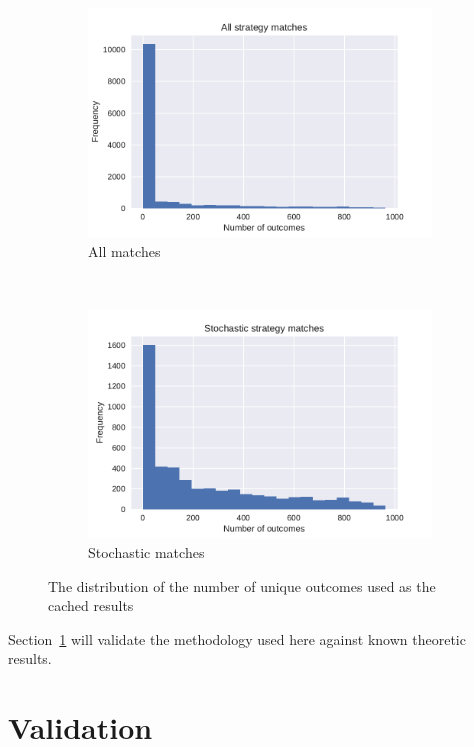 \documentclass{article}
\begin{document}
\begin{figure}[!hbtp]
    \centering
    \begin{subfigure}[t]{.5\textwidth}
        \centering
        \includegraphics[width=.9\textwidth]{./img/number_of_match_outcomes.pdf}
        \caption{All matches}
    \end{subfigure}%
    ~
    \begin{subfigure}[t]{.5\textwidth}
        \centering
        \includegraphics[width=.9\textwidth]{./img/number_of_stochastic_match_outcomes.pdf}
        \caption{Stochastic matches}
    \end{subfigure}%
    \caption{The distribution of the number of unique outcomes used as the
    cached results}
    \label{fig:number_of_stochastic_match_outcomes}
\end{figure}

Section~\ref{sec:validation} will validate the methodology used here against
known theoretic results.

\section{Validation}\label{sec:validation}
\end{document}
